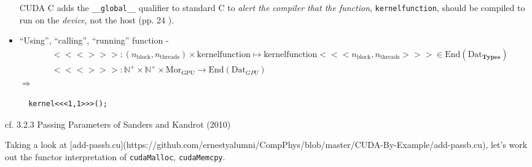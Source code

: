 \documentclass[10pt]{amsart}
\begin{document}
\begin{multicols*}{2}
\begin{itemize}
CUDA C adds the \verb|__global__| qualifier to standard C to \emph{alert the compiler that the function}, \verb|kernelfunction|, should be compiled to run on the \emph{device}, not the host (pp. 24 \cite{SK2010}).    
\item ``Using'', ``calling'', ``running'' function -
  \[
\begin{aligned}
  & <<<>>>: (n_{\text{block}} , n_{\text{threads}}) \times \text{kernelfunction} \mapsto \text{kernelfunction}<<<n_{\text{block}}, n_{\text{threads}}>>> \in \text{End}(\text{Dat}_{\textbf{Types}}) \\
  & <<<>>>:\mathbb{N}^+ \times \mathbb{N}^+ \times \text{Mor}_{\text{GPU}} \to \text{End}(\text{Dat}_{GPU})
  \end{aligned}
\]
$\Longrightarrow$
\begin{lstlisting}
  kernel<<<1,1>>>();
  \end{lstlisting}
  \end{itemize}

cf. 3.2.3 Passing Parameters of Sanders and Kandrot (2010) \cite{SK2010}

Taking a look at [add-passb.cu](https://github.com/ernestyalumni/CompPhys/blob/master/CUDA-By-Example/add-passb.cu), let's work out the functor interpretation of \verb|cudaMalloc|, \verb|cudaMemcpy|.


\end{multicols*}
\end{document}
